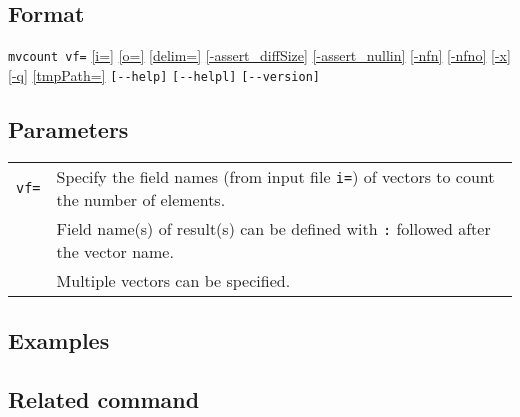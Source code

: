 \subsection*{Format}
\verb|mvcount vf=|
\hyperref[sect:option_i]{[i=]}
\hyperref[sect:option_o]{[o=]}
\hyperref[sect:option_delim]{[delim=]} 
\hyperref[sect:option_assert_diffSize]{[-assert\_diffSize]}
\hyperref[sect:option_assert_nullin]{[-assert\_nullin]}
\hyperref[sect:option_nfn]{[-nfn]} 
\hyperref[sect:option_nfno]{[-nfno]}  
\hyperref[sect:option_x]{[-x]}
\hyperref[sect:option_q]{[-q]}
\hyperref[sect:option_option_tmppath]{[tmpPath=]}
\verb|[--help]|
\verb|[--helpl]|
\verb|[--version]|\\

\subsection*{Parameters}
\begin{table}[htbp]
{\small
\begin{tabular}{ll}
\verb|vf=| & Specify the field names (from input file \verb|i=|) of vectors to count the number of elements. \\
           & Field name(s) of result(s) can be defined with \verb|:| followed after the vector name. \\
           & Multiple vectors can be specified.\\
\end{tabular}
}
\end{table} 

\subsection*{Examples}


\subsection*{Related command}


%
